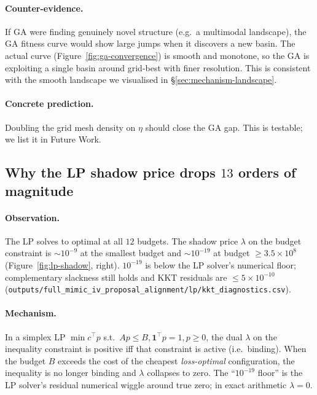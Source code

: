 \paragraph{Counter-evidence.} If GA were finding genuinely novel structure
(e.g.\ a multimodal landscape), the GA fitness curve would show large jumps
when it discovers a new basin. The actual curve
(Figure~\ref{fig:ga-convergence}) is smooth and monotone, so the GA is
exploiting a single basin around grid-best with finer resolution. This is
consistent with the smooth landscape we visualised in
\S\ref{sec:mechanism-landscape}.

\paragraph{Concrete prediction.} Doubling the grid mesh density on $\eta$
should close the GA gap. This is testable; we list it in Future Work.

\subsection{Why the LP shadow price drops $13$ orders of magnitude}
\label{sec:mechanism-lp}

\paragraph{Observation.} The LP solves to optimal at all $12$ budgets. The
shadow price $\lambda$ on the budget constraint is $\sim 10^{-9}$ at the
smallest budget and $\sim 10^{-19}$ at budget $\geq 3.5\!\times\!10^8$
(Figure~\ref{fig:lp-shadow}, right). $10^{-19}$ is below the LP solver's
numerical floor; complementary slackness still holds and KKT residuals are
$\leq 5\!\times\!10^{-10}$
(\texttt{outputs/full\_mimic\_iv\_proposal\_alignment/lp/kkt\_diagnostics.csv}).

\paragraph{Mechanism.} In a simplex LP $\min c^\top p$ s.t.\ $A p \leq B,
\mathbf{1}^\top p = 1, p \geq 0$, the dual $\lambda$ on the inequality
constraint is positive iff that constraint is active (i.e.\ binding). When the
budget $B$ exceeds the cost of the cheapest \emph{loss-optimal} configuration,
the inequality is no longer binding and $\lambda$ collapses to zero. The
``$10^{-19}$ floor'' is the LP solver's residual numerical wiggle around true
zero; in exact arithmetic $\lambda \!=\! 0$.

